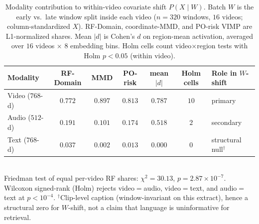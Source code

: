 
\begin{table}[ht]\centering
\caption{Modality contribution to within-video covariate shift $P(X\mid W)$.
Batch $W$ is the early vs.\ late window split inside each video ($n=320$ windows, $16$ videos; column-standardized $X$).
RF-Domain, coordinate-MMD, and PO-risk VIMP are L1-normalized shares.
Mean $|d|$ is Cohen's $d$ on region-mean activation, averaged over $16$ videos $\times$ $8$ embedding bins.
Holm cells count video$\times$region tests with Holm $p<0.05$ (within video).}
\label{tab:msrvtt-mm-shift-contrib}
\small
\begin{tabular}{@{}l ccc cc l@{}}\toprule
Modality & RF-Domain & MMD & PO-risk & mean $|d|$ & Holm cells & Role in $W$-shift \\
\midrule
Video ($768$-d) & $0.772$ & $0.897$ & $0.813$ & $0.787$ & $10$ & primary \\
Audio ($512$-d) & $0.191$ & $0.101$ & $0.174$ & $0.518$ & $2$  & secondary \\
Text ($768$-d)  & $0.037$ & $0.002$ & $0.013$ & $0.000$ & $0$  & structural null$^{\dagger}$ \\
\bottomrule\end{tabular}\\[0.45em]
{\footnotesize
Friedman test of equal per-video RF shares: $\chi^{2}=30.13$, $p=2.87\times 10^{-7}$.
Wilcoxon signed-rank (Holm) rejects video$=$audio, video$=$text, and audio$=$text at $p<10^{-4}$.
$^{\dagger}$Clip-level caption (window-invariant on this extract), hence a structural zero for $W$-shift, not a claim that language is uninformative for retrieval.
}
\end{table}
